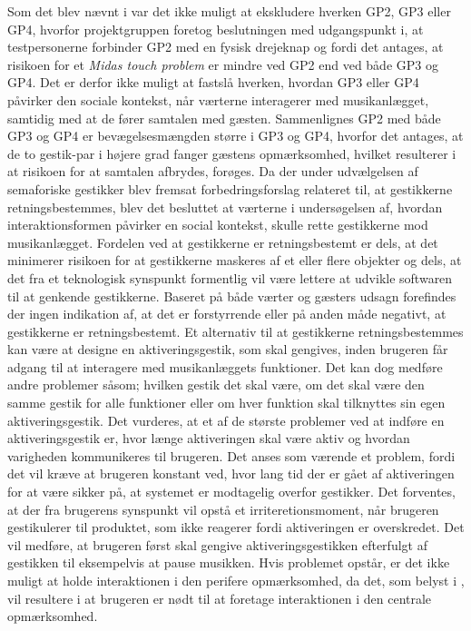 Som det blev nævnt i  var det ikke muligt at ekskludere hverken GP2, GP3 eller GP4, hvorfor projektgruppen foretog beslutningen med udgangspunkt i, at testpersonerne forbinder GP2 med en fysisk drejeknap og fordi det antages, at risikoen for et \textit{Midas touch problem} er mindre ved GP2 end ved både GP3 og GP4. Det er derfor ikke muligt at fastslå hverken, hvordan GP3 eller GP4 påvirker den sociale kontekst, når værterne interagerer med musikanlægget, samtidig med at de fører samtalen med gæsten. Sammenlignes GP2 med både GP3 og GP4 er bevægelsesmængden større i GP3 og GP4, hvorfor det antages, at de to gestik-par i højere grad fanger gæstens opmærksomhed, hvilket resulterer i at risikoen for at samtalen afbrydes, forøges.\blankline
%
Da der under udvælgelsen af semaforiske gestikker blev fremsat forbedringsforslag relateret til, at gestikkerne retningsbestemmes, blev det besluttet at værterne i undersøgelsen af, hvordan interaktionsformen påvirker en social kontekst, skulle rette gestikkerne mod musikanlægget. Fordelen ved at gestikkerne er retningsbestemt er dels, at det minimerer risikoen for at gestikkerne maskeres af et eller flere objekter og dels, at det fra et teknologisk synspunkt formentlig vil være lettere at udvikle softwaren til at genkende gestikkerne. Baseret på både værter og gæsters udsagn forefindes der ingen indikation af, at det er forstyrrende eller på anden måde negativt, at gestikkerne er retningsbestemt. Et alternativ til at gestikkerne retningsbestemmes kan være at designe en aktiveringsgestik, som skal gengives, inden brugeren får adgang til at interagere med musikanlæggets funktioner. Det kan dog medføre andre problemer såsom; hvilken gestik det skal være, om det skal være den samme gestik for alle funktioner eller om hver funktion skal tilknyttes sin egen aktiveringsgestik. Det vurderes, at et af de største problemer ved at indføre en aktiveringsgestik er, hvor længe aktiveringen skal være aktiv og hvordan varigheden kommunikeres til brugeren. Det anses som værende et problem, fordi det vil kræve at brugeren konstant ved, hvor lang tid der er gået af aktiveringen for at være sikker på, at systemet er modtagelig overfor gestikker. Det forventes, at der fra brugerens synspunkt vil opstå et irriteretionsmoment, når brugeren gestikulerer til produktet, som ikke reagerer fordi aktiveringen er overskredet. Det vil medføre, at brugeren først skal gengive aktiveringsgestikken efterfulgt af gestikken til eksempelvis at pause musikken. Hvis problemet opstår, er det ikke muligt at holde interaktionen i den perifere opmærksomhed, da det, som belyst i , vil resultere i at brugeren er nødt til at foretage interaktionen i den centrale opmærksomhed. 

